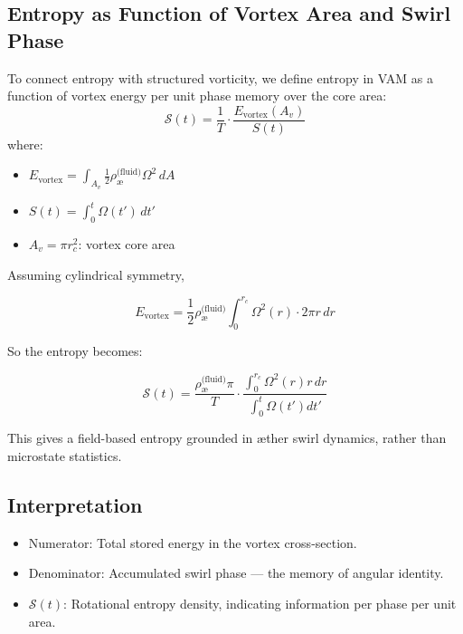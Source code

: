 \documentclass[12pt]{article}
\begin{document}
            \subsection{Entropy as Function of Vortex Area and Swirl Phase}
            To connect entropy with structured vorticity, we define entropy in VAM as a function of vortex energy per unit phase memory over the core area:
            \begin{equation}
                \mathcal{S}(t) = \frac{1}{T} \cdot \frac{E_\text{vortex}(A_v)}{S(t)}
            \end{equation}
            where:
            \begin{itemize}
                \item $E_\text{vortex} = \int_{A_v} \frac{1}{2} \rho_{\text{\ae}}^{\text{(fluid)}} \Omega^2 \, dA$
                \item $S(t) = \int_0^t \Omega(t') \, dt'$
                \item $A_v = \pi r_c^2$: vortex core area
            \end{itemize}

            Assuming cylindrical symmetry,

            \begin{equation}
            E_\text{vortex} = \frac{1}{2} \rho_{\text{\ae}}^{\text{(fluid)}} \int_0^{r_c} \Omega^2(r) \cdot 2\pi r \, dr
            \end{equation}

            So the entropy becomes:

            \begin{equation}
            \boxed{
            \mathcal{S}(t) = \frac{\rho_{\text{\ae}}^{\text{(fluid)}} \pi}{T} \cdot \frac{\int_0^{r_c} \Omega^2(r) r \, dr}{\int_0^t \Omega(t') dt'}
            }
            \end{equation}

            This gives a field-based entropy grounded in æther swirl dynamics, rather than microstate statistics.

            \subsection*{Interpretation}

            \begin{itemize}
            \item Numerator: Total stored energy in the vortex cross-section.
            \item Denominator: Accumulated swirl phase — the memory of angular identity.
                \item $\mathcal{S}(t)$: Rotational entropy density, indicating information per phase per unit area.
            \end{itemize}
\end{document}
